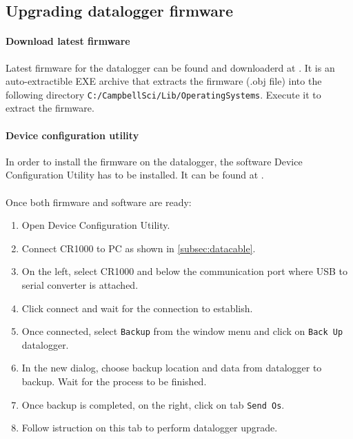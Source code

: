 \subsection{Upgrading datalogger firmware}
\paragraph{Download latest firmware} Latest firmware for the datalogger can be found and downloaderd at \cite{cs4}. It is an auto-extractible EXE archive that extracts the firmware (.obj file) into the following directory {\tt C:/CampbellSci/Lib/OperatingSystems}. Execute it to extract the firmware.
\paragraph{Device configuration utility} In order to install the firmware on the datalogger, the software Device Configuration Utility has to be installed. It can be found at \cite{cs3}.
\paragraph{} Once both firmware and software are ready:
\begin{enumerate}
	\item Open Device Configuration Utility.
	\item Connect CR1000 to PC as shown in \ref{subsec:datacable}.
	\item On the left, select CR1000 and below the communication port where USB to serial converter is attached.
	\item Click connect and wait for the connection to establish.
	\item Once connected, select {\tt Backup} from the window menu and click on {\tt Back Up} datalogger.
	\item In the new dialog, choose backup location and data from datalogger to backup. Wait for the process to be finished.
	\item Once backup is completed, on the right, click on tab {\tt Send Os}.
	\item Follow istruction on this tab to perform datalogger upgrade.
\end{enumerate}